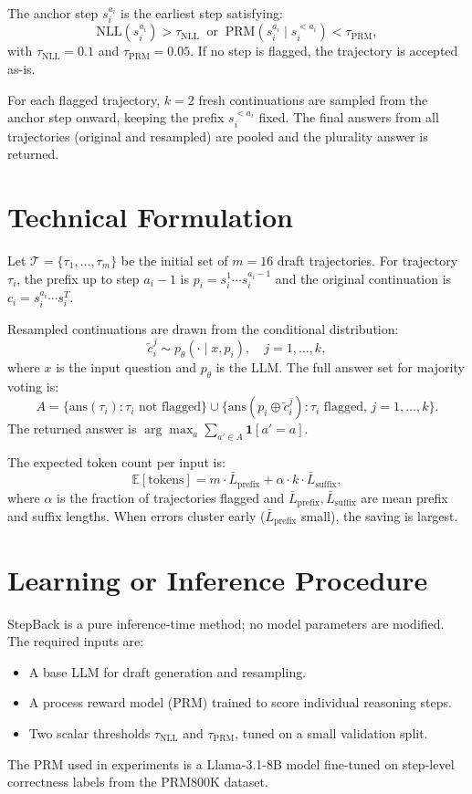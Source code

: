 \documentclass[10pt,twocolumn]{article}
\begin{document}
The anchor step $s_i^{a_i}$ is the earliest step satisfying:
\[
  \text{NLL}(s_i^{a_i}) > \tau_{\text{NLL}}
  \;\;\text{or}\;\;
  \text{PRM}(s_i^{a_i} \mid s_i^{<a_i}) < \tau_{\text{PRM}},
\]
with $\tau_{\text{NLL}} = 0.1$ and $\tau_{\text{PRM}} = 0.05$. If no
step is flagged, the trajectory is accepted as-is.

For each flagged trajectory, $k = 2$ fresh continuations are sampled
from the anchor step onward, keeping the prefix $s_i^{<a_i}$ fixed.
The final answers from all trajectories (original and resampled) are
pooled and the plurality answer is returned.

\section{Technical Formulation}

Let $\mathcal{T} = \{\tau_1, \ldots, \tau_m\}$ be the initial set of
$m = 16$ draft trajectories. For trajectory $\tau_i$, the prefix up to
step $a_i - 1$ is $p_i = s_i^1 \cdots s_i^{a_i - 1}$ and the original
continuation is $c_i = s_i^{a_i} \cdots s_i^T$.

Resampled continuations are drawn from the conditional distribution:
\[
  \tilde{c}_i^j \sim p_\theta(\cdot \mid x, p_i),
  \quad j = 1, \ldots, k,
\]
where $x$ is the input question and $p_\theta$ is the LLM. The full
answer set for majority voting is:
\[
  A = \{\text{ans}(\tau_i) : \tau_i \text{ not flagged}\}
    \cup \{\text{ans}(p_i \oplus \tilde{c}_i^j) :
           \tau_i \text{ flagged},\, j=1,\ldots,k\}.
\]
The returned answer is $\arg\max_{a} \sum_{a' \in A} \mathbf{1}[a' = a]$.

The expected token count per input is:
\[
  \mathbb{E}[\text{tokens}] = m \cdot \bar{L}_{\text{prefix}}
    + \alpha \cdot k \cdot \bar{L}_{\text{suffix}},
\]
where $\alpha$ is the fraction of trajectories flagged and
$\bar{L}_{\text{prefix}}, \bar{L}_{\text{suffix}}$ are mean prefix and
suffix lengths. When errors cluster early ($\bar{L}_{\text{prefix}}$
small), the saving is largest.

\section{Learning or Inference Procedure}

StepBack is a pure inference-time method; no model parameters are
modified. The required inputs are:
\begin{itemize}[itemsep=2pt,parsep=0pt]
  \item A base LLM for draft generation and resampling.
  \item A process reward model (PRM) trained to score individual
    reasoning steps.
  \item Two scalar thresholds $\tau_{\text{NLL}}$ and
    $\tau_{\text{PRM}}$, tuned on a small validation split.
\end{itemize}
The PRM used in experiments is a Llama-3.1-8B model fine-tuned on
step-level correctness labels from the PRM800K dataset.
\end{document}

